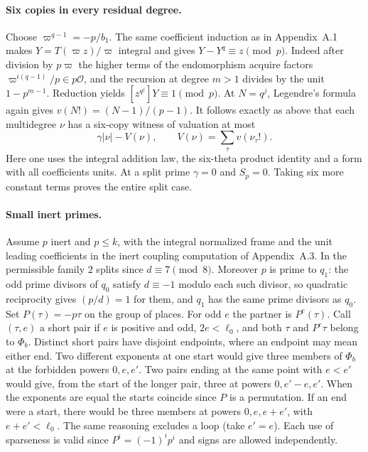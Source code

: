 \paragraph{Six copies in every residual degree.}
Choose $\varpi^{q-1}=-p/b_1$. The same coefficient induction as in
Appendix~A.1 makes $Y=T(\varpi z)/\varpi$ integral and gives
$Y-Y^q\equiv z\pmod p$. Indeed after division by $p\varpi$ the higher
terms of the endomorphism acquire factors
$\varpi^{i(q-1)}/p\in p\mathcal O$, and the recursion at degree $m>1$
divides by the unit $1-p^{m-1}$. Reduction yields
$[z^{q^j}]Y\equiv1\pmod p$.
At $N=q^j$, Legendre's formula again gives $v(N!)=(N-1)/(p-1)$.
It follows exactly as above that each multidegree $\nu$ has a six-copy
witness of valuation at most
\begin{equation}\label{eq:jet-six-general}
 \gamma|\nu|-V(\nu),\qquad V(\nu)=\sum_\tau v(\nu_\tau!).
\end{equation}
Here one uses the integral addition law, the six-theta product identity
and a form with all coefficients units. At a split prime $\gamma=0$
and $S_p=0$. Taking six more constant terms proves the entire split case.

\paragraph{Small inert primes.}
Assume $p$ inert and $p\le k$, with the integral normalized frame
and the unit leading coefficients in the inert coupling computation of
Appendix~A.3. In the permissible family $2$ splits since $d\equiv7\pmod8$.
Moreover $p$ is prime to $q_1$: the odd prime divisors of $q_0$
satisfy $d\equiv-1$ modulo each such divisor, so quadratic reciprocity
gives $(p/d)=1$ for them, and $q_1$ has the same prime divisors as $q_0$.
Set $P(\tau)=-p\tau$ on the group of places. For odd $e$ the partner is
$P^e(\tau)$. Call $(\tau,e)$ a short pair if $e$ is positive and odd,
$2e<\ell_0$, and both $\tau$ and $P^e\tau$ belong to $\Phi_b$.
Distinct short pairs have disjoint endpoints, where an endpoint may
mean either end. Two different exponents at one start would give three
members of $\Phi_b$ at the forbidden powers $0,e,e'$. Two pairs ending
at the same point with $e<e'$ would give, from the start of the longer
pair, three at powers $0,e'-e,e'$. When the exponents are equal the
starts coincide since $P$ is a permutation. If an end were a start,
there would be three members at powers $0,e,e+e'$, with
$e+e'<\ell_0$. The same reasoning excludes a loop (take $e'=e$).
Each use of sparseness is valid since $P^i=(-1)^i p^i$ and signs
are allowed independently.

